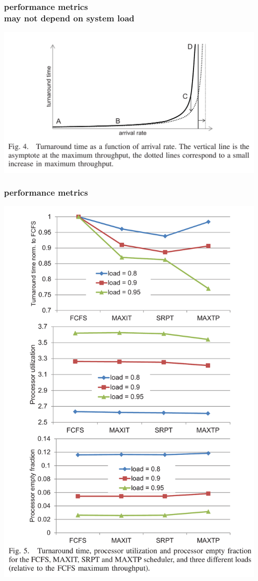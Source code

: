 \documentclass[utf8,10pt]{beamer}
\begin{document}
\begin{frame}
  \frametitle{performance metrics \\may not depend on system load
    }
  \centering
  \includegraphics[height=0.7\textheight, keepaspectratio]{./arrival_rate}
\end{frame}


\begin{frame}
  \frametitle{performance metrics}
  \centering
  \includegraphics[height=0.7\textheight, keepaspectratio]{./empty_utilization_comparison}
\end{frame}
\end{document}
